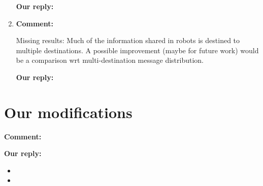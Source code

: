 \documentclass{article}
\begin{document}
\begin{enumerate}
\begin{flushleft}
  \textbf{Our reply:}
\end{flushleft}


\item \begin{flushleft}
  \textbf{Comment:}
\end{flushleft}
Missing results: Much of the information shared in robots is destined to multiple destinations. A possible improvement (maybe for future work) would be a comparison wrt multi-destination message distribution.

\begin{flushleft}
  \textbf{Our reply:}
\end{flushleft}

\end{enumerate}

\newpage


\section{Our modifications}

\begin{flushleft}
  \textbf{Comment:}
\end{flushleft}

\begin{flushleft}
  \textbf{Our reply:}
\end{flushleft}

\begin{itemize}
\item 
\item
\end{itemize}
\end{document}
